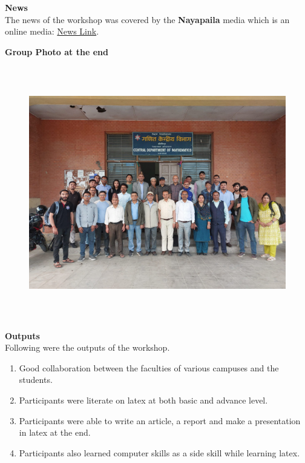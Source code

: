 \documentclass[a4paper,12pt]{report}
\begin{document}
\clearpage

\vspace*{10mm}
{\bfseries \large News}\\[3mm]
The news of the workshop was covered by the \textbf{Nayapaila} media which is an online media: \href{https://nayapailaonline.com/2024/05/08/%e0%a4%97%e0%a4%a3%e0%a4%bf%e0%a4%a4-%e0%a4%95%e0%a5%87%e0%a4%a8%e0%a5%8d%e0%a4%a6%e0%a5%8d%e0%a4%b0%e0%a5%80%e0%a4%af-%e0%a4%b5%e0%a4%bf%e0%a4%ad%e0%a4%be%e0%a4%97%e0%a4%ae%e0%a4%be-%e0%a5%a9/}{News Link}.


\vspace*{50mm}

{\bfseries \large Group Photo at the end}
\vspace*{5mm}

\begin{figure}[h!]
  \centering
  \includegraphics[width=15cm, height=11cm]{group.jpg}
\end{figure}
\clearpage

\vspace*{2cm}
{\bfseries \Large Outputs}\\[5mm]
Following were the outputs of the workshop.

\begin{enumerate}
\item Good collaboration between the faculties of various campuses and the students.
\item Participants were literate on latex at both basic and advance level.
\item Participants were able to write an article, a report and make a
  presentation in latex at the end.
  \item Participants also learned computer skills as a side skill while learning latex.
\end{enumerate}
\end{document}

